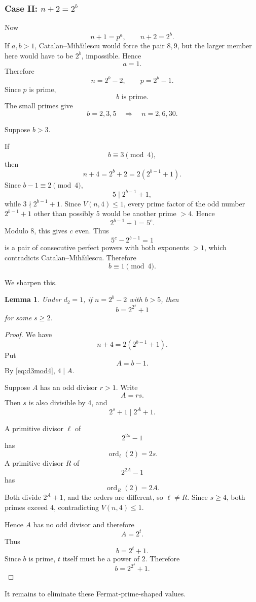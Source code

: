 \documentclass[11pt]{article}
\newtheorem{lemma}[theorem]{Lemma}
\newcommand{\ord}{\operatorname{ord}}
\begin{document}
\subsubsection{Case II: \(n+2=2^b\)}

Now
\[
n+1=p^a,\qquad n+2=2^b.
\]
If \(a,b>1\), Catalan--Mih\H ailescu would force the pair
\(8,9\), but the larger member here would have to be \(2^b\), impossible.
Hence
\[
a=1.
\]
Therefore
\[
n=2^b-2,
\qquad
p=2^b-1.
\]
Since \(p\) is prime,
\[
\boxed{b\text{ is prime}.}
\tag{9}
\]
The small primes give
\[
b=2,3,5
\quad\Longrightarrow\quad
n=2,6,30.
\]

Suppose \(b>3\).

If
\[
b\equiv3\pmod4,
\]
then
\[
n+4=2^b+2=2(2^{b-1}+1).
\]
Since \(b-1\equiv2\pmod4\),
\[
5\mid 2^{b-1}+1,
\]
while \(3\nmid 2^{b-1}+1\).  Since \(V(n,4)\leq1\), every prime factor of
the odd number \(2^{b-1}+1\) other than possibly \(5\) would be another
prime \(>4\).  Hence
\[
2^{b-1}+1=5^c.
\]
Modulo \(8\), this gives \(c\) even.  Thus
\[
5^c-2^{b-1}=1
\]
is a pair of consecutive perfect powers with both exponents \(>1\), which
contradicts Catalan--Mih\H ailescu.  Therefore
\[
\boxed{b\equiv1\pmod4.}
\tag{10}\label{eq:d3mod4}
\]

We sharpen this.

\begin{lemma}\label{lem:fermatform}
Under \(d_2=1\), if \(n=2^b-2\) with \(b>5\), then
\[
b=2^{2^s}+1
\]
for some \(s\geq2\).
\end{lemma}

\begin{proof}
We have
\[
n+4=2(2^{b-1}+1).
\]
Put
\[
A=b-1.
\]
By \eqref{eq:d3mod4}, \(4\mid A\).

Suppose \(A\) has an odd divisor \(r>1\).  Write
\[
A=rs.
\]
Then \(s\) is also divisible by \(4\), and
\[
2^s+1\mid2^A+1.
\]

A primitive divisor \(\ell\) of
\[
2^{2s}-1
\]
has
\[
\ord_\ell(2)=2s.
\]
A primitive divisor \(R\) of
\[
2^{2A}-1
\]
has
\[
\ord_R(2)=2A.
\]
Both divide \(2^A+1\), and the orders are different, so
\(\ell\neq R\).  Since \(s\geq4\), both primes exceed \(4\), contradicting
\(V(n,4)\leq1\).

Hence \(A\) has no odd divisor and therefore
\[
A=2^t.
\]
Thus
\[
b=2^t+1.
\]
Since \(b\) is prime, \(t\) itself must be a power of \(2\).  Therefore
\[
b=2^{2^s}+1.
\]
\end{proof}

It remains to eliminate these Fermat-prime-shaped values.
\end{document}
